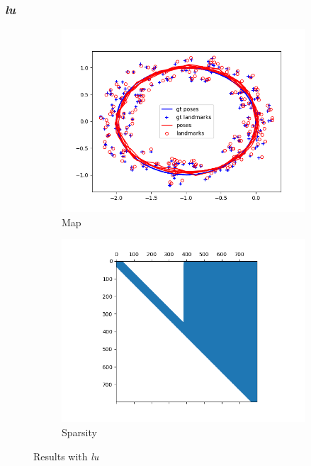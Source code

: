 \documentclass[12pt, a4paper]{article}
\begin{document}
\subsubsection{\textit{lu}}
\begin{figure}[H]
  \centering
  \begin{subfigure}[b]{0.45\textwidth}
    \includegraphics[width=\textwidth]{./results/linear/lu_2d_linear_loop_map.png}
    \caption{Map}
  \end{subfigure}
  \hfill
  \begin{subfigure}[b]{0.45\textwidth}
    \includegraphics[width=\textwidth]{./results/linear/lu_2d_linear_loop_sparsity.png}
    \caption{Sparsity}
  \end{subfigure}
  \caption{Results with \textit{lu}}
\end{figure}
\end{document}
